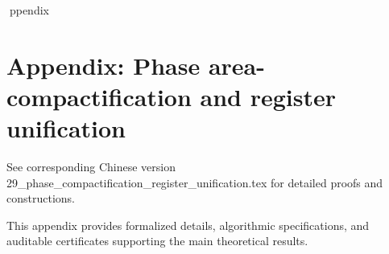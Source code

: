ppendix

\section*{Appendix: Phase area-compactification and register unification}

See corresponding Chinese version 29_phase_compactification_register_unification.tex for detailed proofs and constructions.

This appendix provides formalized details, algorithmic specifications, and auditable certificates supporting the main theoretical results.

